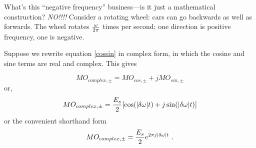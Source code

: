 \documentclass[11pt,preprint]{aastex}
\begin{document}
       
        What's this ``negative frequency'' business---is it just a
mathematical construction? {\it NO!!!!} Consider a rotating wheel: cars
can go backwards as well as forwards. The wheel rotates $\omega \over
2\pi$ times per second; one direction is positive frequency, one is
negative.


        Suppose we rewrite equation \ref{cossin} in complex form, in
which the cosine and sine terms are real and complex. This gives

\begin{mathletters} 
\begin{equation}
	MO_{complex, \pm} = MO_{cos, \pm} + j MO_{sin, \pm} 
\end{equation}
\noindent or,  %
\begin{equation}
	MO_{complex, \pm} = {E_s \over 2} [ \cos ( |\delta \omega | t )
+ j \sin ( |\delta \omega | t )]
\end{equation}
\noindent or the convenient shorthand form
\begin{equation}
	MO_{complex, \pm} = {E_s \over 2} e^{2 \pi j |\delta \omega| t} \ .
\end{equation}
\end{mathletters}
\end{document}
